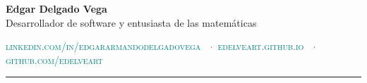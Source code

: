 \documentclass[letterpaper,10pt,oneside]{article}
\begin{document}




\noindent
\huge{\bf{Edgar Delgado Vega}}
\vspace{0.25em} \\
\large{{{Desarrollador de software y entusiasta de las matemáticas}}}


\vspace{1.25em}

\normalsize{
  \noindent
  \textcolor{teal}{{\scshape{linkedin.com/in/edgararmandodelgadovega}} $\ \  \cdot$
    \hspace{0.1in} {\scshape{edelveart.github.io}} $\ \  \cdot$
    \hspace{0.1in} {\scshape{github.com/edelveart}}
    }
    }

  \textcolor{teal}{\hrule}

\end{document}
